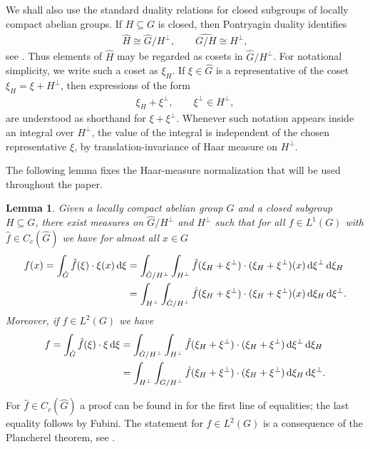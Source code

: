 \documentclass{article}
\renewcommand{\d}{\, \textup{d}}
\newtheorem{lemma}[theorem]{Lemma}
\begin{document}
We shall also use the standard duality relations for closed subgroups of locally compact abelian groups. If $H\subseteq G$ is closed, then Pontryagin duality identifies
\begin{align*}
    \hat H \cong \hat G/H^\perp,
\qquad
\widehat{G/H} \cong H^\perp,
\end{align*}
see \cite[Theorem 4.39]{Folland}. Thus elements of $\hat H$ may be regarded as cosets in $\hat G/H^\perp$. For notational simplicity, we write such a coset as $\xi_H$. If $\xi\in\hat G$ is a representative of the coset $\xi_H=\xi+H^\perp$, then expressions of the form
\begin{align*}
    \xi_H+\xi^\perp,
\qquad \xi^\perp\in H^\perp,
\end{align*}
are understood as shorthand for $\xi+\xi^\perp$. Whenever such notation appears inside an integral over $H^\perp$, the value of the integral is independent of the chosen representative $\xi$, by translation-invariance of Haar measure on $H^\perp$.

The following lemma fixes the Haar-measure normalization that will be used throughout the paper.
\begin{lemma}\label{lem:Fubini}
Given a locally compact abelian group $G$ and a closed subgroup $H\subseteq G$, there exist measures on $\hat{G}/H^\perp$ and $H^\perp$ such that for all $f \in L^1(G)$ with $\hat{f} \in C_c(\hat{G})$ we have for almost all $x \in G$
\begin{align*}
f(x)
    =\int_{\hat{G}} \hat{f}(\xi) \cdot \xi(x) \d \xi 
    &= \int_{\hat{G}/H^\perp} \int_{H^\perp} \hat{f}(\xi_H+\xi^\perp) \cdot (\xi_H+\xi^\perp)(x) \d \xi^\perp \d \xi_H \\
    &= \int_{H^\perp} \int_{\hat{G}/H^\perp} \hat{f}(\xi_H+\xi^\perp) \cdot (\xi_H+\xi^\perp)(x) \d \xi_H \d \xi^\perp.
\end{align*}
Moreover, if $f \in L^2(G)$ we have 
\begin{align*}
    f
    =\int_{\hat{G}} \hat{f}(\xi) \cdot \xi \d \xi 
    &= \int_{\hat{G}/H^\perp} \int_{H^\perp} \hat{f}(\xi_H+\xi^\perp) \cdot (\xi_H+\xi^\perp) \d \xi^\perp \d \xi_H \\
    &= \int_{H^\perp} \int_{\hat{G}/H^\perp} \hat{f}(\xi_H+\xi^\perp) \cdot (\xi_H+\xi^\perp) \d \xi_H \d \xi^\perp.
\end{align*}
\end{lemma}
For $\hat{f} \in C_c(\hat{G})$ a proof can be found in \cite[Theorem 2.49]{Folland} for the first line of equalities; the last equality follows by Fubini. The statement for $f \in L^2(G)$ is a consequence of the Plancherel theorem, see \cite[Theorem 4.25]{Folland}. 
\end{document}
